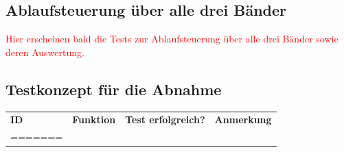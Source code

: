 \documentclass[a4paper, 11pt]{article}
\begin{document}
\subsection{Ablaufsteuerung über alle drei Bänder}
\textcolor{red}{Hier erscheinen bald die Tests zur Ablaufsteuerung über alle drei Bänder sowie deren Auswertung.}

\subsection{Testkonzept für die Abnahme} 
\begin{table}[H]
\center
    \begin{tabularx}{\textwidth}{|l|X|X|X|}
        \hline
        \textbf{ID}&\textbf{Funktion}&\textbf{Test erfolgreich?}&\textbf{Anmerkung}\\
=======

\end{tabularx}
\end{table}
\end{document}
